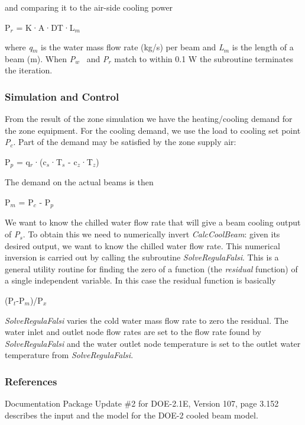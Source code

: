 and comparing it to the air-side cooling power

P\(_{r}\) = K·A·DT·L\(_{m}\)

where \emph{q\(_{m}\)} is the water mass flow rate (kg/s) per beam and \emph{L\(_{m}\)} is the length of a beam (m). When \emph{P}\(_{w}\) ~and \emph{P\(_{r}\)} match to within 0.1 W the subroutine terminates the iteration.

\subsubsection{Simulation and Control}\label{simulation-and-control-4}

From the result of the zone simulation we have the heating/cooling demand for the zone equipment. For the cooling demand, we use the load to cooling set point \emph{P\(_{c}\)}. Part of the demand may be satisfied by the zone supply air:

P\(_{p}\) = q\(_{r}\)·(c\(_{s}\)·T\(_{s}\) - c\(_{z}\)·T\(_{z}\))

The demand on the actual beams is then

P\(_{m}\) = P\(_{c}\) - P\(_{p}\)

We want to know the chilled water flow rate that will give a beam cooling output of \emph{P\(_{s}\)}. To obtain this we need to numerically invert \emph{CalcCoolBeam}: given its desired output, we want to know the chilled water flow rate. This numerical inversion is carried out by calling the subroutine \emph{SolveRegulaFalsi}. This is a general utility routine for finding the zero of a function (the \emph{residual} function) of a single independent variable. In this case the residual function is basically

(P\(_{t}\)-P\(_{m}\))/P\(_{x}\)

\emph{SolveRegulaFalsi} varies the cold water mass flow rate to zero the residual. The water inlet and outlet node flow rates are set to the flow rate found by \emph{SolveRegulaFalsi} and the water outlet node temperature is set to the outlet water temperature from \emph{SolveRegulaFalsi}.

\subsubsection{References}\label{references-4}

Documentation Package Update \#2 for DOE-2.1E, Version 107, page 3.152 describes the input and the model for the DOE-2 cooled beam model.

